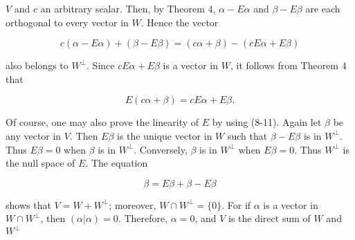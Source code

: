 \(V\) and \(c\) an arbitrary scalar. Then, by Theorem 4, \(\alpha-E\alpha\) and \(\beta-E\beta\) are each orthogonal to every vector in \(W\). Hence the vector

\[c(\alpha-E\alpha)+(\beta-E\beta)=(c\alpha+\beta)-(cE\alpha+E\beta)\]

also belongs to \(W^{\bot}\). Since \(cE\alpha+E\beta\) is a vector in \(W\), it follows from Theorem 4 that

\[E(c\alpha+\beta)=cE\alpha+E\beta.\]

Of course, one may also prove the linearity of \(E\) by using (8-11). Again let \(\beta\) be any vector in \(V\). Then \(E\beta\) is the unique vector in \(W\) such that \(\beta-E\beta\) is in \(W^{\bot}\). Thus \(E\beta=0\) when \(\beta\) is in \(W^{\bot}\). Conversely, \(\beta\) is in \(W^{\bot}\) when \(E\beta=0\). Thus \(W^{\bot}\) is the null space of \(E\). The equation

\[\beta=E\beta+\beta-E\beta\]

shows that \(V=W+W^{\bot}\); moreover, \(W\cap W^{\bot}=\{0\}\). For if \(\alpha\) is a vector in \(W\cap W^{\bot}\), then \((\alpha|\alpha)=0\). Therefore, \(\alpha=0\), and \(V\) is the direct sum of \(W\) and \(W^{\bot}\) 